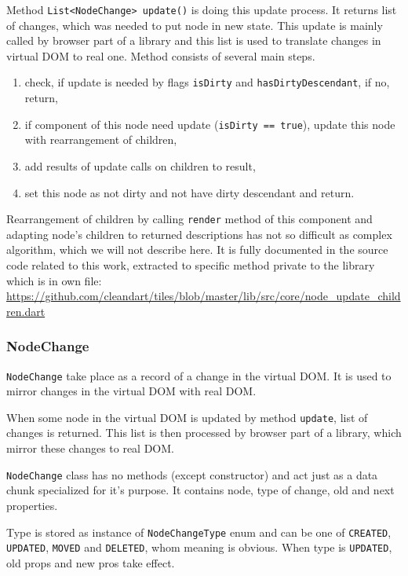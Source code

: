 \documentclass[oneside, 12pt]{book}
\begin{document}
      Method \texttt{List<NodeChange> update()} is doing this update process. 
      It returns list of changes, which was needed to put node in new state.
      This update is mainly called by browser part of a library and this list is used to translate changes in virtual DOM to real one. 
      Method consists of several main steps.
      \begin{enumerate}
        \item check, if update is needed by flags \texttt{isDirty} and \texttt{hasDirtyDescendant}, if no, return,
        \item if component of this node need update (\texttt{isDirty == true}), update this node with rearrangement of children,
        \item add results of update calls on children to result,
        \item set this node as not dirty and not have dirty descendant and return.
      \end{enumerate}

      Rearrangement of children by calling \texttt{render} method of this component 
      and adapting node's children to returned descriptions 
      has not so difficult as complex algorithm, which we will not describe here. 
      It is fully documented in the source code related to this work, 
      extracted to specific method private to the library which is in own file:
      \url{https://github.com/cleandart/tiles/blob/master/lib/src/core/node_update_children.dart}

    \subsubsection{NodeChange}\label{subsubsec:our-architecture-core-node-change}
      \texttt{NodeChange} take place as a record of a change in the virtual DOM. 
      It is used to mirror changes in the virtual DOM with real DOM. 

      When some node in the virtual DOM is updated by method \texttt{update}, list of changes is returned. 
      This list is then processed by browser part of a library, which mirror these changes to real DOM.

      \texttt{NodeChange} class has no methods (except constructor) and act just as a data chunk specialized for it's purpose. 
      It contains node, type of change, old and next properties. 

      Type is stored as instance of \texttt{NodeChangeType} enum and can be one of \texttt{CREATED}, \texttt{UPDATED}, 
      \texttt{MOVED} and \texttt{DELETED}, whom meaning is obvious. 
      When type is \texttt{UPDATED}, old props and new pros take effect. 
\end{document}
